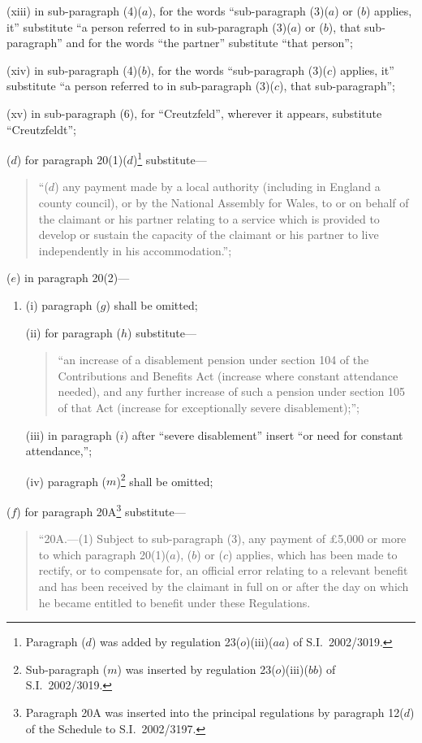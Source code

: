 \documentclass[12pt,a4paper]{article}
\begin{document}
\begin{enumerate}
\begin{enumerate}
(xiii) in sub-paragraph (4)($a$), for the words “sub-paragraph (3)($a$)  or ($b$)  applies, it” substitute “a person referred to in sub-paragraph (3)($a$)  or ($b$), that sub-paragraph” and for the words “the partner” substitute “that person”;

(xiv) in sub-paragraph (4)($b$), for the words “sub-paragraph (3)($c$)  applies, it” substitute “a person referred to in sub-paragraph (3)($c$), that sub-paragraph”;

(xv) in sub-paragraph (6), for “Creutzfeld”, wherever it appears, substitute “Creutzfeldt”;
\end{enumerate}

($d$) for paragraph 20(1)($d$)\footnote{Paragraph ($d$) was added by regulation 23($o$)(iii)($aa$) of S.I.\ 2002/3019.} substitute—
\begin{quotation}
“($d$) any payment made by a local authority (including in England a county council), or by the National Assembly for Wales, to or on behalf of the claimant or his partner relating to a service which is provided to develop or sustain the capacity of the claimant or his partner to live independently in his accommodation.”;
\end{quotation}

($e$) in paragraph 20(2)—
\begin{enumerate}\item[]
(i) paragraph ($g$)  shall be omitted;

(ii) for paragraph ($h$)  substitute—
\begin{quotation}
    “an increase of a disablement pension under section 104 of the Contributions and Benefits Act (increase where constant attendance needed), and any further increase of such a pension under section 105 of that Act (increase for exceptionally severe disablement);”; 
\end{quotation}

(iii) in paragraph ($i$)  after “severe disablement” insert “or need for constant attendance,”;

(iv) paragraph ($m$)\footnote{Sub-paragraph ($m$) was inserted by regulation 23($o$)(iii)($bb$) of S.I.\ 2002/3019.} shall be omitted;
\end{enumerate}

($f$) for paragraph 20A\footnote{Paragraph 20A was inserted into the principal regulations by paragraph 12($d$) of the Schedule to S.I.\ 2002/3197.} substitute—
\begin{quotation}
“20A.---(1)  Subject to sub-paragraph (3), any payment of £5,000 or more to which paragraph 20(1)($a$), ($b$)  or ($c$)  applies, which has been made to rectify, or to compensate for, an official error relating to a relevant benefit and has been received by the claimant in full on or after the day on which he became entitled to benefit under these Regulations.


\end{quotation}
\end{enumerate}
\end{document}
